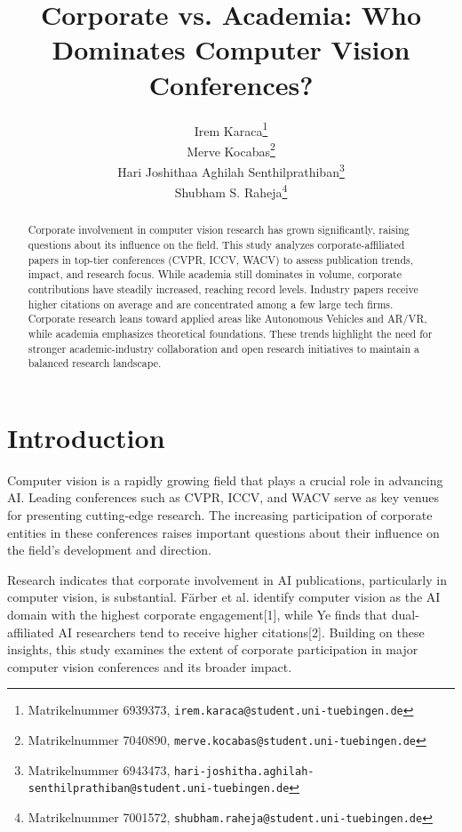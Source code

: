 \documentclass{article}
\title{Corporate vs. Academia: Who Dominates Computer Vision Conferences?}
\author{
  \small Irem Karaca\thanks{Matrikelnummer 6939373, \texttt{irem.karaca@student.uni-tuebingen.de}}\\
  \And
  \small Merve Kocabas\thanks{Matrikelnummer 7040890, \texttt{merve.kocabas@student.uni-tuebingen.de}}\\
  \And
  \small Hari Joshithaa Aghilah Senthilprathiban\thanks{Matrikelnummer 6943473, \texttt{hari-joshitha.aghilah-senthilprathiban@student.uni-tuebingen.de}}\\
  \And
  \small Shubham S. Raheja\thanks{Matrikelnummer 7001572, \texttt{shubham.raheja@student.uni-tuebingen.de}}\\
}
\begin{document}
\maketitle
\vspace{-10pt}
\begin{abstract}

Corporate involvement in computer vision research has grown significantly, raising questions about its influence on the field. This study analyzes corporate-affiliated papers in top-tier conferences (CVPR, ICCV, WACV) to assess publication trends, impact, and research focus. While academia still dominates in volume, corporate contributions have steadily increased, reaching record levels. Industry papers receive higher citations on average and are concentrated among a few large tech firms. Corporate research leans toward applied areas like Autonomous Vehicles and AR/VR, while academia emphasizes theoretical foundations. These trends highlight the need for stronger academic-industry collaboration and open research initiatives to maintain a balanced research landscape.

\end{abstract}


\section{Introduction}
Computer vision is a rapidly growing field that plays a crucial role in advancing AI. Leading conferences such as CVPR, ICCV, and WACV serve as key venues for presenting cutting-edge research. The increasing participation of corporate entities in these conferences raises important questions about their influence on the field’s development and direction.

Research indicates that corporate involvement in AI publications, particularly in computer vision, is substantial. Färber et al. identify computer vision as the AI domain with the highest corporate engagement[1], while Ye finds that dual-affiliated AI researchers tend to receive higher citations[2]. Building on these insights, this study examines the extent of corporate participation in major computer vision conferences and its broader impact.
\end{document}

